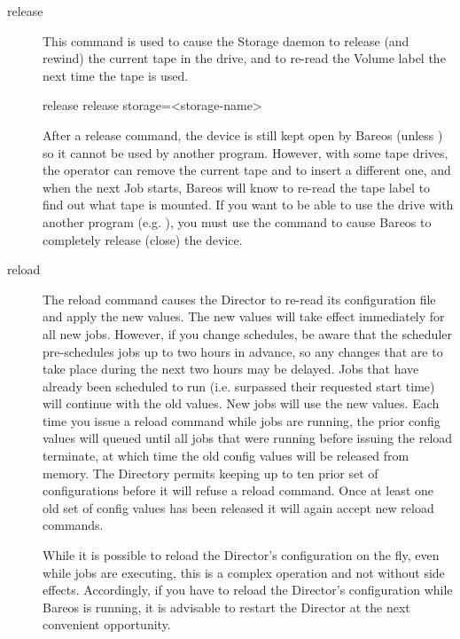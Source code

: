 \begin{description}
\item [release]
   This command is used to cause the Storage daemon to release (and rewind) the
   current tape in the drive, and to re-read the Volume label the next time
   the tape is used.

\begin{bconsole}{release}
release storage=<storage-name>
\end{bconsole}

   After a release command, the device is still kept open by Bareos (unless
   ) so it
   cannot be used by another program.  However, with some tape drives, the
   operator can remove the current tape and to insert a different one, and
   when the next Job starts, Bareos will know to re-read the tape label to
   find out what tape is mounted.  If you want to be able to use the drive
   with another program (e.g.  ), you must use the 
   command to cause Bareos to completely release (close) the device.

\item [reload]
   The reload command causes the Director to re-read its configuration
   file and apply the new values. The new values will take effect
   immediately for all new jobs.  However, if you change schedules,
   be aware that the scheduler pre-schedules jobs up to two hours in
   advance, so any changes that are to take place during the next two
   hours may be delayed.  Jobs that have already been scheduled to run
   (i.e. surpassed their requested start time) will continue with the
   old values.  New jobs will use the new values. Each time you issue
   a reload command while jobs are running, the prior config values
   will queued until all jobs that were running before issuing
   the reload terminate, at which time the old config values will
   be released from memory. The Directory permits keeping up to
   ten prior set of configurations before it will refuse a reload
   command. Once at least one old set of config values has been
   released it will again accept new reload commands.

   While it is possible to reload the Director's configuration on the fly,
   even while jobs are executing, this is a complex operation and not
   without side effects.  Accordingly, if you have to reload the Director's
   configuration while Bareos is running, it is advisable to restart the
   Director at the next convenient opportunity.


\end{description}
